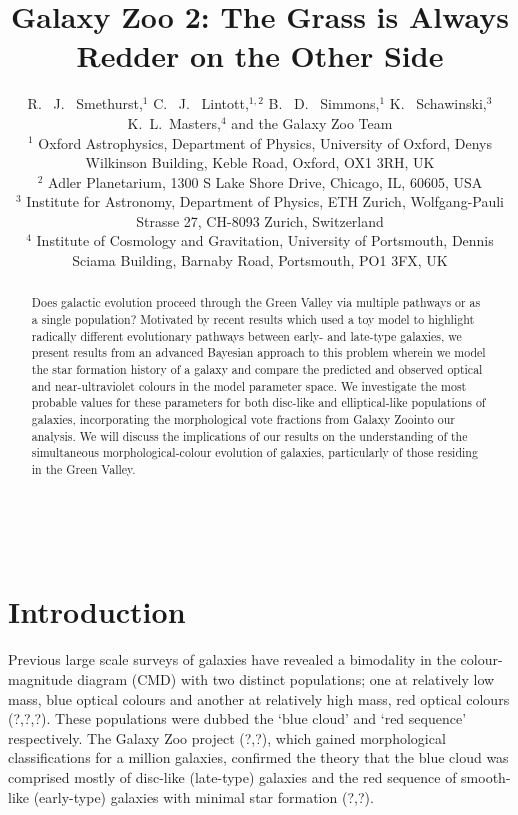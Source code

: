 \documentclass{mn2e}
\begin{document}
\title[The Star Fomation History of the Green Valley]{Galaxy Zoo 2: The Grass is Always Redder on the Other Side}
\author[Smethurst et al. 2014]{R. ~J. ~Smethurst,$^1$ C. ~J. ~Lintott,$^{1,2}$ B. ~D. ~Simmons,$^{1}$ K. ~Schawinski,$^{3}$ \newauthor K.~L.~Masters,$^{4}$ and the Galaxy Zoo Team
\\ $^1$ Oxford Astrophysics, Department of Physics, University of Oxford, Denys Wilkinson Building, Keble Road, Oxford, OX1 3RH, UK 
\\ $^2$ Adler Planetarium, 1300 S Lake Shore Drive, Chicago, IL, 60605, USA 
\\ $^3$ Institute for Astronomy, Department of Physics, ETH Zurich, Wolfgang-Pauli Strasse 27, CH-8093 Zurich, Switzerland 
\\ $^4$ Institute of Cosmology and Gravitation, University of Portsmouth, Dennis Sciama Building, Barnaby Road, Portsmouth, PO1 3FX, UK }

\maketitle

\begin{abstract}
Does galactic evolution proceed through the Green Valley via multiple pathways or as a single population? Motivated by recent results which used a toy model to highlight radically different evolutionary pathways between early- and late-type galaxies, we present results from an advanced Bayesian approach to this problem wherein we model the star formation history of a galaxy and compare the predicted and observed optical and near-ultraviolet colours in the model parameter space. We investigate the most probable values for these parameters for both disc-like and elliptical-like populations of galaxies, incorporating the morphological vote fractions from Galaxy Zoo\footnotemark[1] into our analysis. We will discuss the implications of our results on the understanding of the simultaneous morphological-colour evolution of galaxies, particularly of those residing in the Green Valley. 
\end{abstract}

\\

\section{Introduction}
Previous large scale surveys of galaxies have revealed a bimodality in the colour-magnitude diagram (CMD) with two distinct populations; one at relatively low mass, blue optical colours and another at relatively high mass, red optical colours (?,?,?). These populations were dubbed the `blue cloud' and `red sequence' respectively. The Galaxy Zoo project (?,?), which gained morphological classifications for a million galaxies, confirmed the theory that the blue cloud was comprised mostly of disc-like (late-type) galaxies and the red sequence of smooth-like (early-type) galaxies with minimal star formation (?,?). 
\end{document}
